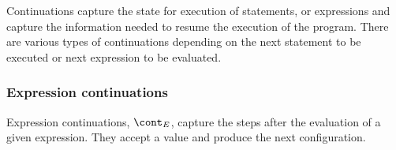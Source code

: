 \documentclass{article}
\begin{document}
\newcommand{\expressionmeta}{\ensuremath{\mathit{E}}}
\newcommand{\expressionsmeta}{\expressionmeta{s}}
\newcommand{\variablemeta}{\ensuremath{\mathit{X}}}
\newcommand{\boolmeta}{\ensuremath{\mathit{B}}}
\newcommand{\integermeta}{\ensuremath{\mathit{I}}}
\newcommand{\doublemeta}{\ensuremath{\mathit{D}}}
\newcommand{\stringmeta}{\ensuremath{\mathit{S}}}
\newcommand{\idmeta}{\ensuremath{\mathit{X}}}
\newcommand{\membermeta}{\ensuremath{\mathit{M}}}
\newcommand{\typemeta}{\ensuremath{\mathit{T}}}
\newcommand{\statementmeta}{\ensuremath{\mathit{\stmt}}}
\newcommand{\labelmeta}{\ensuremath{\mathit{\tt{L}}}}

Continuations capture the state for execution of statements, or expressions and capture the information needed to resume the execution of the program.
There are various types of continuations depending on the next statement to be executed or next expression to be evaluated.
\subsubsection{Expression continuations}
\label{subsubsec:expression-continuations}

Expression continuations, $\econt$, capture the steps after the evaluation of a given expression.
They accept a value and produce the next configuration.
\end{document}
